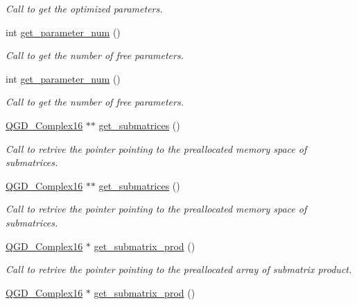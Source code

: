 \begin{DoxyCompactItemize}
\begin{DoxyCompactList}\small\item\em Call to get the optimized parameters. \end{DoxyCompactList}\item 
int \hyperlink{class_operation__block_af7ff4a8876a7b1c062ea2f35efac18b0}{get\+\_\+parameter\+\_\+num} ()
\begin{DoxyCompactList}\small\item\em Call to get the number of free parameters. \end{DoxyCompactList}\item 
int \hyperlink{class_operation__block_af7ff4a8876a7b1c062ea2f35efac18b0}{get\+\_\+parameter\+\_\+num} ()
\begin{DoxyCompactList}\small\item\em Call to get the number of free parameters. \end{DoxyCompactList}\item 
\hyperlink{struct_q_g_d___complex16}{Q\+G\+D\+\_\+\+Complex16} $\ast$$\ast$ \hyperlink{class_sub___matrix___decomposition_acb59a69a1e9b88476796d77c0a86a597}{get\+\_\+submatrices} ()
\begin{DoxyCompactList}\small\item\em Call to retrive the pointer pointing to the preallocated memory space of submatrices. \end{DoxyCompactList}\item 
\hyperlink{struct_q_g_d___complex16}{Q\+G\+D\+\_\+\+Complex16} $\ast$$\ast$ \hyperlink{class_sub___matrix___decomposition_a57425b0b1008e6b412732f1032e6316d}{get\+\_\+submatrices} ()
\begin{DoxyCompactList}\small\item\em Call to retrive the pointer pointing to the preallocated memory space of submatrices. \end{DoxyCompactList}\item 
\hyperlink{struct_q_g_d___complex16}{Q\+G\+D\+\_\+\+Complex16} $\ast$ \hyperlink{class_sub___matrix___decomposition_afd3e1d04d7582ce7b8d7a772baff44c3}{get\+\_\+submatrix\+\_\+prod} ()
\begin{DoxyCompactList}\small\item\em Call to retrive the pointer pointing to the preallocated array of submatrix product. \end{DoxyCompactList}\item 
\hyperlink{struct_q_g_d___complex16}{Q\+G\+D\+\_\+\+Complex16} $\ast$ \hyperlink{class_sub___matrix___decomposition_abac35ecb6606cc598658fa66601b3892}{get\+\_\+submatrix\+\_\+prod} ()

\end{DoxyCompactItemize}
